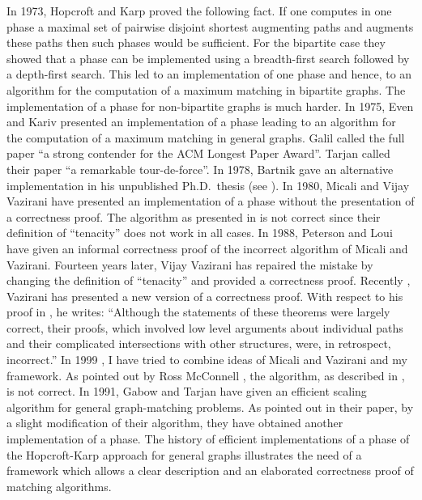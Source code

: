 \documentclass[12pt,twoside,a4paper]{article}
\begin{document}
In 1973, Hopcroft and Karp \cite{HK} proved the following fact. If one computes
in one phase a maximal set of pairwise disjoint shortest augmenting paths and augments 
these paths then  such
phases would be sufficient. For the bipartite case they showed that a phase can
be implemented using a breadth-first search followed by a depth-first search.
This led to an  implementation of one phase and hence, to an 
algorithm for the computation of a maximum matching in bipartite graphs.
The implementation of a phase for non-bipartite graphs is much harder.
In 1975, Even and Kariv \cite{EK,Ka} presented an 
implementation of a phase leading to an  
algorithm for the computation of a maximum matching in general graphs.
Galil \cite{Gal} called the full paper \cite{Ka} ``a strong contender for the ACM 
Longest Paper Award''. Tarjan \cite{Ta} called their paper ``a remarkable 
tour-de-force''.
In 1978, Bartnik \cite{Bar} gave an alternative  implementation
in his unpublished Ph.D.~thesis (see \cite{GoMi}).
In 1980, Micali and Vijay Vazirani \cite{MV} have presented an 
implementation of a phase without the presentation of a correctness proof. 
The algorithm as presented in \cite{MV} is not correct since their definition
of ``tenacity'' does not work in all cases. In 1988, Peterson and Loui
have given an informal correctness proof of the incorrect algorithm of Micali
and Vazirani. Fourteen years later, Vijay Vazirani \cite{Va1} has repaired the 
mistake by changing the definition of ``tenacity'' and provided a correctness proof. 
Recently \cite{Va2}, Vazirani has presented a new version of a correctness proof.
With respect to his proof in \cite{Va1}, he writes: ``Although the statements of these theorems
were largely correct, their proofs, which involved low level arguments about individual
paths and their complicated intersections with other structures, were, in retrospect,
incorrect.'' In 1999 \cite{Bl3}, I have tried to
combine ideas of Micali and Vazirani and my framework. As pointed out by Ross McConnell
\cite{Mc}, the algorithm, as described in \cite{Bl3}, is not correct. In 1991,
Gabow and Tarjan \cite{GaTa2} have given an efficient scaling algorithm for general
graph-matching problems. As pointed out in their paper, by a slight modification of
their algorithm, they have obtained another  implementation of a phase.
The history of efficient implementations of a phase of the Hopcroft-Karp approach
for general graphs illustrates the need of a framework which allows a clear description 
and an elaborated correctness proof of matching algorithms.
\end{document}
